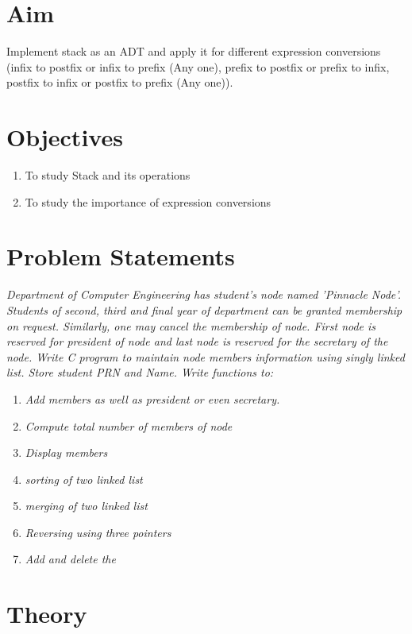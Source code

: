\documentclass[11pt]{article}
\begin{document}
\tableofcontents
\thispagestyle{empty}
\clearpage
\setcounter{page}{1}

\section{Aim}
Implement stack as an ADT and apply it for different expression conversions (infix to postfix or
infix to prefix (Any one), prefix to postfix or prefix to infix, postfix to infix or postfix to prefix
(Any one)).

\section{Objectives}
\begin{enumerate}
	\item To study Stack and its operations
	\item To study the importance of expression conversions
\end{enumerate}

\section{Problem Statements}
\textit{Department of Computer Engineering has student's node named 'Pinnacle Node'. Students of
	second, third and final year of department can be granted membership on request. Similarly, one
	may cancel the membership of node. First node is reserved for president of node and last node is
	reserved for the secretary of the node. Write C program to maintain node members information
	using singly linked list. Store student PRN and Name. Write functions to:}
\begin{enumerate}
	\item \textit{ Add members as well as president or even secretary.}
	\item \textit{ Compute total number of members of node }
	\item \textit{ Display members}
	\item \textit{ sorting of two linked list}
	\item \textit{ merging of two linked list}
	\item \textit{ Reversing using three pointers}
	\item \textit{ Add and delete the}
\end{enumerate}
\section{Theory}
\end{document}

